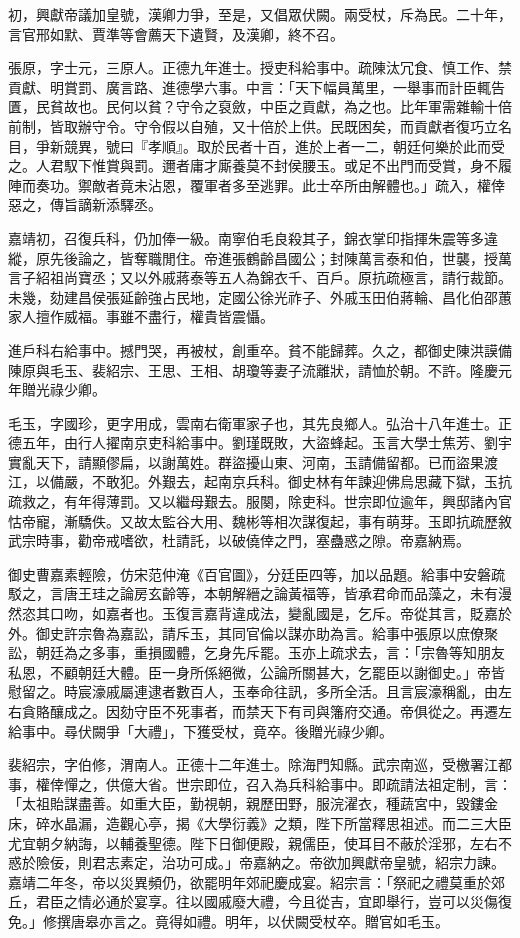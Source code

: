 \begin{pinyinscope}
初，興獻帝議加皇號，漢卿力爭，至是，又倡眾伏闕。兩受杖，斥為民。二十年，言官邢如默、賈準等會薦天下遺賢，及漢卿，終不召。

張原，字士元，三原人。正德九年進士。授吏科給事中。疏陳汰冗食、慎工作、禁貢獻、明賞罰、廣言路、進德學六事。中言：「天下幅員萬里，一舉事而計臣輒告匱，民貧故也。民何以貧？守令之裒斂，中臣之貢獻，為之也。比年軍需雜輸十倍前制，皆取辦守令。守令假以自殖，又十倍於上供。民既困矣，而貢獻者復巧立名目，爭新競異，號曰『孝順』。取於民者十百，進於上者一二，朝廷何樂於此而受之。人君馭下惟賞與罰。邇者庸才廝養莫不封侯腰玉。或足不出門而受賞，身不履陣而奏功。禦敵者竟未沾恩，覆軍者多至逃罪。此士卒所由解體也。」疏入，權倖惡之，傳旨謫新添驛丞。

嘉靖初，召復兵科，仍加俸一級。南寧伯毛良殺其子，錦衣掌印指揮朱震等多違縱，原先後論之，皆奪職閒住。帝進張鶴齡昌國公；封陳萬言泰和伯，世襲，授萬言子紹祖尚寶丞；又以外戚蔣泰等五人為錦衣千、百戶。原抗疏極言，請行裁節。未幾，劾建昌侯張延齡強占民地，定國公徐光祚子、外戚玉田伯蔣輪、昌化伯邵蕙家人擅作威福。事雖不盡行，權貴皆震懾。

進戶科右給事中。撼門哭，再被杖，創重卒。貧不能歸葬。久之，都御史陳洪謨備陳原與毛玉、裴紹宗、王思、王相、胡瓊等妻子流離狀，請恤於朝。不許。隆慶元年贈光祿少卿。

毛玉，字國珍，更字用成，雲南右衛軍家子也，其先良鄉人。弘治十八年進士。正德五年，由行人擢南京吏科給事中。劉瑾既敗，大盜蜂起。玉言大學士焦芳、劉宇實亂天下，請顯僇扁，以謝萬姓。群盜擾山東、河南，玉請備留都。已而盜果渡江，以備嚴，不敢犯。外艱去，起南京兵科。御史林有年諫迎佛烏思藏下獄，玉抗疏救之，有年得薄罰。又以繼母艱去。服闋，除吏科。世宗即位逾年，興邸諸內官怙帝寵，漸驕佚。又故太監谷大用、魏彬等相次謀復起，事有萌芽。玉即抗疏歷敘武宗時事，勸帝戒嗜欲，杜請託，以破僥倖之門，塞蠱惑之隙。帝嘉納焉。

御史曹嘉素輕險，仿宋范仲淹《百官圖》，分廷臣四等，加以品題。給事中安磐疏駁之，言唐王珪之論房玄齡等，本朝解縉之論黃福等，皆承君命而品藻之，未有漫然恣其口吻，如嘉者也。玉復言嘉背違成法，變亂國是，乞斥。帝從其言，貶嘉於外。御史許宗魯為嘉訟，請斥玉，其同官倫以謀亦助為言。給事中張原以庶僚聚訟，朝廷為之多事，重損國體，乞身先斥罷。玉亦上疏求去，言：「宗魯等知朋友私恩，不顧朝廷大體。臣一身所係絕微，公論所關甚大，乞罷臣以謝御史。」帝皆慰留之。時宸濠戚屬連逮者數百人，玉奉命往訊，多所全活。且言宸濠稱亂，由左右貪賂釀成之。因劾守臣不死事者，而禁天下有司與籓府交通。帝俱從之。再遷左給事中。尋伏闕爭「大禮」，下獲受杖，竟卒。後贈光祿少卿。

裴紹宗，字伯修，渭南人。正德十二年進士。除海門知縣。武宗南巡，受檄署江都事，權倖憚之，供億大省。世宗即位，召入為兵科給事中。即疏請法祖定制，言：「太祖貽謀盡善。如重大臣，勤視朝，親歷田野，服浣濯衣，種蔬宮中，毀鏤金床，碎水晶漏，造觀心亭，揭《大學衍義》之類，陛下所當釋思祖述。而二三大臣尤宜朝夕納誨，以輔養聖德。陛下日御便殿，親儒臣，使耳目不蔽於淫邪，左右不惑於險佞，則君志素定，治功可成。」帝嘉納之。帝欲加興獻帝皇號，紹宗力諫。嘉靖二年冬，帝以災異頻仍，欲罷明年郊祀慶成宴。紹宗言：「祭祀之禮莫重於郊丘，君臣之情必通於宴享。往以國戚廢大禮，今且從吉，宜即舉行，豈可以災傷復免。」修撰唐皋亦言之。竟得如禮。明年，以伏闕受杖卒。贈官如毛玉。


\end{pinyinscope}
